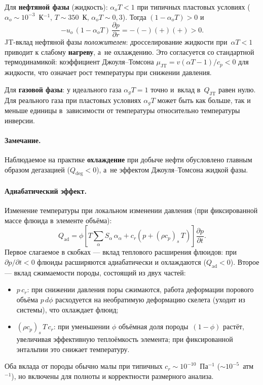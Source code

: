 \documentclass[12pt,a4paper]{article}
\begin{document}
Для \textbf{нефтяной фазы} (жидкость): $\alpha_o T < 1$ при типичных
пластовых условиях ($\alpha_o \sim 10^{-3}$~К$^{-1}$, $T \sim 350$~К,
$\alpha_o T \sim 0{,}3$). Тогда $(1-\alpha_o T) > 0$ и
\[
  -u_o\,(1-\alpha_o T)\,\frac{\partial p}{\partial r}
  = -(-)(\text{+})(\text{+}) > 0.
\]
JT-вклад нефтяной фазы \emph{положителен}: дросселирование
жидкости при~$\alpha T < 1$ приводит к слабому \textbf{нагреву},
а~не охлаждению. Это согласуется со стандартной термодинамикой:
коэффициент Джоуля--Томсона $\mu_{\mathrm{JT}} = v(\alpha T - 1)/c_p < 0$
для жидкости, что означает рост температуры при снижении давления.

Для \textbf{газовой фазы}: у идеального газа $\alpha_g T = 1$ точно
и~вклад в~$Q_{\mathrm{JT}}$ равен нулю. Для реального газа при
пластовых условиях $\alpha_g T$ может быть как больше, так и меньше
единицы в~зависимости от температуры относительно температуры инверсии.

\paragraph{Замечание.}
Наблюдаемое на практике \textbf{охлаждение} при добыче нефти
обусловлено главным образом дегазацией ($Q_{\mathrm{deg}} < 0$),
а~не эффектом Джоуля--Томсона жидкой фазы.

\paragraph{Адиабатический эффект.}
Изменение температуры при локальном изменении давления (при фиксированной
массе флюида в элементе объёма):
\begin{equation}\label{eq:Qad}
  \boxed{
    Q_{\mathrm{ad}} = \phi\!\left[
      T\sum_\alpha S_\alpha\,\alpha_\alpha
      + c_r\!\left(p + (\rho c_p)_s\,T\right)
    \right]\frac{\partial p}{\partial t}.
  }
\end{equation}
Первое слагаемое в скобках --- вклад теплового расширения флюидов:
при~$\partial p/\partial t < 0$ флюиды расширяются адиабатически и
охлаждаются ($Q_{\mathrm{ad}} < 0$). Второе --- вклад сжимаемости
породы, состоящий из двух частей:
\begin{itemize}[nosep]
  \item $p\,c_r$: при снижении давления поры сжимаются, работа деформации
        порового объёма $p\,d\phi$ расходуется на необратимую деформацию
        скелета (уходит из системы), что охлаждает флюид;
  \item $(\rho c_p)_s\,T\,c_r$: при уменьшении $\phi$ объёмная доля
        породы~$(1-\phi)$ растёт, увеличивая эффективную теплоёмкость
        элемента; при фиксированной энтальпии это снижает температуру.
\end{itemize}
Оба вклада от породы обычно малы при типичных
$c_r \sim 10^{-10}$~Па$^{-1}$ ($\sim 10^{-5}$~атм$^{-1}$),
но включены для полноты и корректности размерного анализа.
\end{document}
